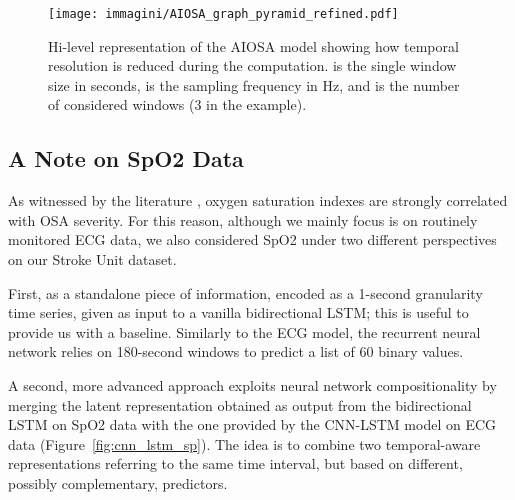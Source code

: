 \documentclass[5p,twocolumn,lefttitle]{elsarticle}
\begin{document}
\begin{figure*}[tb]
    \centering
    \texttt{[image: immagini/AIOSA\_graph\_pyramid\_refined.pdf]}
    \caption{Hi-level representation of the AIOSA model showing how temporal resolution is reduced during the computation.  is the single window size in seconds,  is the sampling frequency in Hz, and  is the number of considered windows (3 in the example).} 
    \label{fig:temporal_model}
\end{figure*}

\begin{table}[tb]
\centering
\caption{Optimizer hyperparameters.\label{tab:opt}}
\end{table}


\subsection{A Note on SpO2 Data}

As witnessed by the literature \cite{wali2020correlation}, oxygen saturation indexes are strongly correlated with OSA severity. 
For this reason, although we mainly focus is on routinely monitored ECG data, we also considered SpO2 under two different perspectives on our Stroke Unit dataset. 

First, as a standalone piece of information, encoded as a 1-second granularity time series, given as input to a vanilla bidirectional LSTM; this is useful to provide us with a baseline. Similarly to the ECG model, the recurrent neural network relies on 180-second windows to predict a list of 60 binary values. 

A second, more advanced approach exploits neural network compositionality by merging the latent representation obtained as output from the bidirectional LSTM on SpO2 data with the one provided by the CNN-LSTM model on ECG data (Figure~\ref{fig:cnn_lstm_sp}). The idea is to combine two temporal-aware representations referring to the same time interval, but based on different, possibly complementary, predictors.
\end{document}
